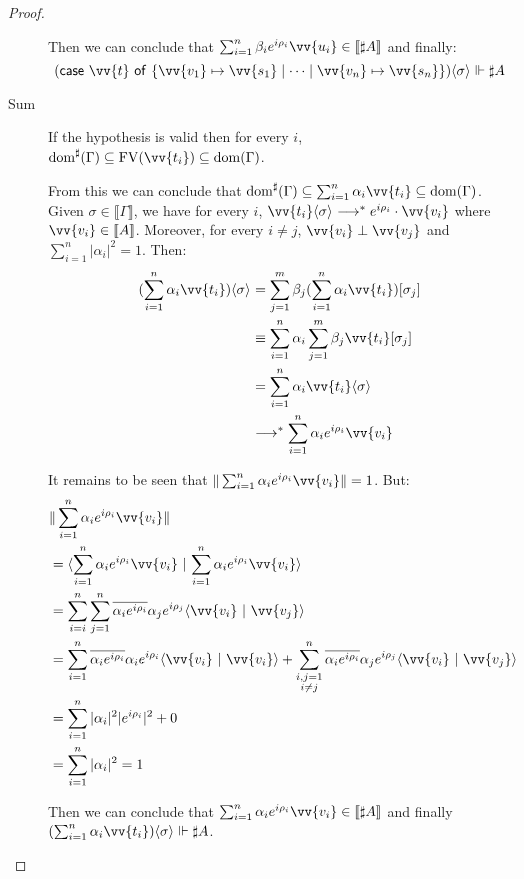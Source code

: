\documentclass[runningheads,orivec,envcountsame,envcountsect]{llncs}
\newcommand\lra{\longrightarrow}
\newcommand\ansubst[2]{\ensuremath{\langle #1 \rangle_{#2}}}
\newcommand\dom[1]{\mathrm{dom}(#1)}
\newcommand\sdom[1]{\mathrm{dom}^{\sharp}(#1)}
\newcommand\FV[1]{\mathrm{FV}(#1)}
\def\scal#1#2{\langle{#1}~|~{#2}\rangle}
\def\gencase#1#2#3#4#5{\ensuremath{\mathsf{case}~#1~\mathsf{of}~\{#2\mapsto #4 \mid \dotsb \mid #3\mapsto #5\}}}
\def\eval{\lra^*}
\def\sem#1{\llbracket#1\rrbracket}
\def\real{\Vdash}
\begin{document}
\begin{proof}
\begin{description}
    Then we can conclude that $\sum_{i=1}^{n}\beta_i e^{i\rho_i}\vv{u_i}\in\sem{\sharp A}$ and finally:
    \[
        (\gencase{\vv{t}}{\vv{v_1}}{\vv{v_n}}{\vv{s_1}}{\vv{s_n}})\ansubst{\sigma}{}\real\sharp A
    \]

    \item[Sum] If the hypothesis is valid then for every $i$, $\sdom{\Gamma}\subseteq\FV{\vv{t_i}}\subseteq\dom{\Gamma}$.
    
    From this we can conclude that $\sdom{\Gamma}\subseteq\sum_{i=1}^{n}\alpha_i \vv{t_i}\subseteq\dom{\Gamma}$. Given $\sigma\in\sem{\Gamma}$, we have for every $i$, $\vv{t_i}\ansubst{\sigma}{}\eval e^{i\rho_i}\cdot\vv{v_i}$ where $\vv{v_i}\in\sem{A}$. Moreover, for every $i\neq j$, $\vv{v_i}\perp\vv{v_j}$ and $\sum_{i=1}^{n}|\alpha_i|^2=1$. Then:
    \begin{align*}
    (\sum_{i=1}^{n}\alpha_i\vv{t_i})\ansubst{\sigma}{} 
    &= \sum_{j=1}^{m}\beta_j(\sum_{i=1}^{n}\alpha_i \vv{t_i})[\sigma_j]\\
    &\equiv \sum_{i=1}^{n} \alpha_i \sum_{j=1}^{m} \beta_j \vv{t_i}[\sigma_j]\\
    &=\sum_{i=1}^{n} \alpha_i \vv{t_i}\ansubst{\sigma}{}\\
    &\eval \sum_{i=1}^{n} \alpha_i e^{i\rho_i} \vv{v_i}\\
    \end{align*}

    It remains to be seen that $\|\sum_{i=1}^{n} \alpha_i e^{i\rho_i} \vv{v_i}\|=1$. But:
    \begin{align*}
    &\|\sum_{i=1}^{n} \alpha_i e^{i\rho_i} \vv{v_i}\| \\
    &=\scal{\sum_{i=1}^{n} \alpha_i e^{i\rho_i}\vv{v_i}}{\sum_{i=1}^{n} \alpha_i e^{i\rho_i} \vv{v_i}}\\
    &= \sum_{i=i}^{n}\sum_{j=1}^{n} \overline{\alpha_i e^{i\rho_i}}\alpha_j e^{i\rho_j} \scal{\vv{v_i}}{\vv{v_j}}\\
    &=\sum_{i=1}^{n} \overline{\alpha_i e^{i\rho_i}}\alpha_i e^{i\rho_i} \scal{\vv{v_i}}{\vv{v_i}} + \sum_{\substack{i,j=1\\i\neq j}}^{n} \overline{\alpha_i e^{i\rho_i}}\alpha_j e^{i\rho_j} \scal{\vv{v_i}}{\vv{v_j}}\\
    &=\sum_{i=1}^{n}|\alpha_i|^2 |e^{i\rho_i}|^2+ 0\\
    &=\sum_{i=1}^{n}|\alpha_i|^2 = 1\\
    \end{align*}

    Then we can conclude that $\sum_{i=1}^{n}\alpha_i e^{i\rho_i}\vv{v_i}\in\sem{\sharp A}$ and finally $(\sum_{i=1}^{n}\alpha_i\vv{t_i})\ansubst{\sigma}{}\real\sharp A$.


\end{description}
\end{proof}
\end{document}
